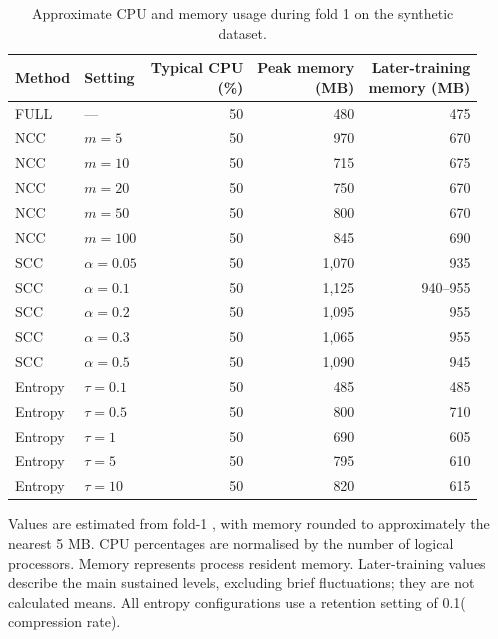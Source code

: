 \documentclass[a4paper,twoside,12pt]{report}
\begin{document}
\begin{table}[htbp]
    \centering
    \caption{Approximate CPU and memory usage during fold 1 on the synthetic dataset.}
    \label{tab:synth_resources}
    \small
    \begin{tabular}{llrrr}
        \toprule
        Method & Setting & \shortstack{Typical CPU\\(\%)} & \shortstack{Peak memory\\(MB)} & \shortstack{Later-training\\memory (MB)} \\
        \midrule
        FULL & --- & 50 & 480 & 475 \\
        \midrule
        NCC & $m=5$ & 50 & 970 & 670 \\
        NCC & $m=10$ & 50 & 715 & 675 \\
        NCC & $m=20$ & 50 & 750 & 670 \\
        NCC & $m=50$ & 50 & 800 & 670 \\
        NCC & $m=100$ & 50 & 845 & 690 \\
        \midrule
        SCC & $\alpha=0.05$ & 50 & 1,070 & 935 \\
        SCC & $\alpha=0.1$ & 50 & 1,125 & 940--955 \\
        SCC & $\alpha=0.2$ & 50 & 1,095 & 955 \\
        SCC & $\alpha=0.3$ & 50 & 1,065 & 955 \\
        SCC & $\alpha=0.5$ & 50 & 1,090 & 945 \\
        \midrule
        Entropy & $\tau=0.1$ & 50 & 485 & 485 \\
        Entropy & $\tau=0.5$ & 50 & 800 & 710 \\
        Entropy & $\tau=1$ & 50 & 690 & 605 \\
        Entropy & $\tau=5$ & 50 & 795 & 610 \\
        Entropy & $\tau=10$ & 50 & 820 & 615 \\
        \bottomrule
    \end{tabular}

    \vspace{0.5em}
    \begin{minipage}{0.95\textwidth}
        \footnotesize
        Values are estimated from  fold-1 , with memory rounded to approximately the nearest 5 MB. CPU percentages are normalised by the number of logical processors. Memory represents process resident memory. Later-training values describe the main sustained levels, excluding brief fluctuations; they are not calculated means. All entropy configurations use a retention setting of 0.1( compression rate).
    \end{minipage}
\end{table}
\end{document}
